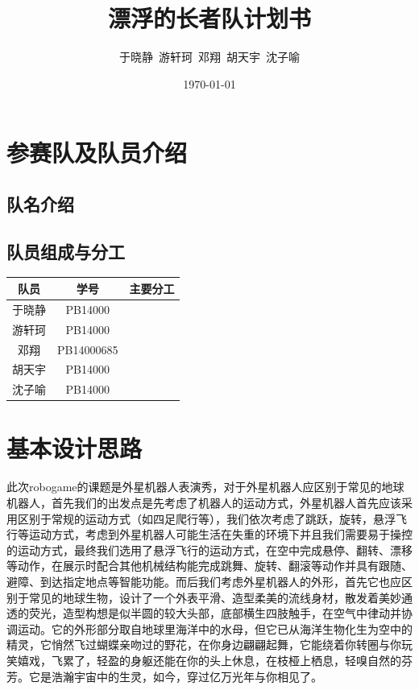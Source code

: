 \documentclass{ctexart}
\begin{document}

\title{漂浮的长者队计划书}
\author{于晓静\ 游轩珂\ 邓翔\ 胡天宇\ 沈子喻}
\date{\today}

\maketitle

\tableofcontents
\newpage
\section{参赛队及队员介绍}
\subsection{队名介绍}
\subsection{队员组成与分工}
\begin{center}
\begin{tabular}{|c|c|c|}
	\hline
	队员&学号&主要分工\\
	\hline
	于晓静&PB14000&\\
	\hline
	游轩珂&PB14000&\\
	\hline
	邓翔&PB14000685&\\
	\hline
	胡天宇&PB14000&\\
	\hline
	沈子喻&PB14000&\\
	\hline
\end{tabular}
\end{center}

\section{基本设计思路}
此次robogame的课题是外星机器人表演秀，对于外星机器人应区别于常见的地球机器人，首先我们的出发点是先考虑了机器人的运动方式，外星机器人首先应该采用区别于常规的运动方式（如四足爬行等），我们依次考虑了跳跃，旋转，悬浮飞行等运动方式，考虑到外星机器人可能生活在失重的环境下并且我们需要易于操控的运动方式，最终我们选用了悬浮飞行的运动方式，在空中完成悬停、翻转、漂移等动作，在展示时配合其他机械结构能完成跳舞、旋转、翻滚等动作并具有跟随、避障、到达指定地点等智能功能。而后我们考虑外星机器人的外形，首先它也应区别于常见的地球生物，设计了一个外表平滑、造型柔美的流线身材，散发着美妙通透的荧光，造型构想是似半圆的较大头部，底部横生四肢触手，在空气中律动并协调运动。它的外形部分取自地球里海洋中的水母，但它已从海洋生物化生为空中的精灵，它悄然飞过蝴蝶亲吻过的野花，在你身边翩翩起舞，它能绕着你转圈与你玩笑嬉戏，飞累了，轻盈的身躯还能在你的头上休息，在枝桠上栖息，轻嗅自然的芬芳。它是浩瀚宇宙中的生灵，如今，穿过亿万光年与你相见了。
\end{document}
